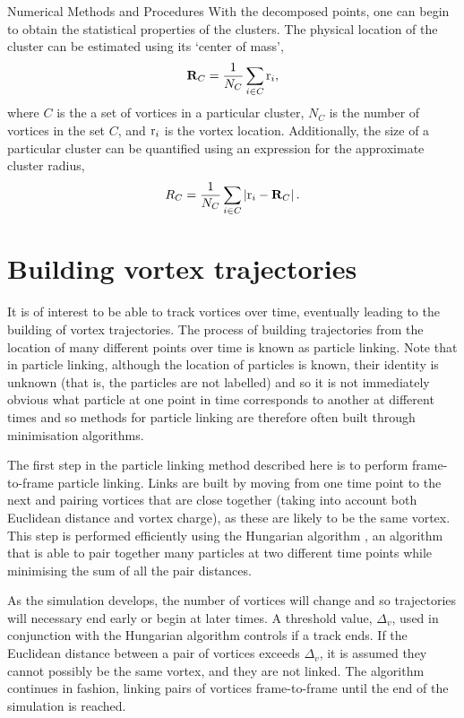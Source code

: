 \begin{chapter}{\label{cha:numerics}Numerical Methods and Procedures}
With the decomposed points, one can begin to obtain the statistical properties of the clusters. The physical location of the cluster can be estimated using its `center of mass',
\begin{equation}\label{eq:rcacom}
  \mathbf{R}_C = \frac{1}{N_C}\sum\limits_{i\in C}{\rm r}_i,
\end{equation}
where $C$ is the a set of vortices in a particular cluster, $N_C$ is the number of vortices in the set $C$, and ${\rm r}_i$ is the vortex location. Additionally, the size of a particular cluster can be quantified using an expression for the approximate cluster radius,
\begin{equation}\label{eq:rcacom}
  R_C = \frac{1}{N_C}\sum\limits_{i\in C} \left |{\rm r}_i - {\bf R}_C \right |.
\end{equation}

\section{\label{section:vortextracking} Building vortex trajectories}
It is of interest to be able to track vortices over time, eventually leading to the building of vortex trajectories. The process of building trajectories from the location of many different points over time is known as particle linking. Note that in particle linking, although the location of particles is known, their identity is unknown (that is, the particles are not labelled) and so it is not immediately obvious what particle at one point in time corresponds to another at different times and so methods for particle linking are therefore often built through minimisation algorithms. 

The first step in the particle linking method described here is to perform frame-to-frame particle linking. Links are built by moving from one time point to the next and pairing vortices that are close together (taking into account both Euclidean distance and vortex charge), as these are likely to be the same vortex. This step is performed efficiently using the Hungarian algorithm \cite{hung}, an algorithm that is able to pair together many particles at two different time points while minimising the sum of all the pair distances.

As the simulation develops, the number of vortices will change and so trajectories will necessary end early or begin at later times. A threshold value, $\Delta_v$, used in conjunction with the Hungarian algorithm controls if a track ends. If the Euclidean distance between a pair of vortices exceeds $\Delta_v$, it is assumed they cannot possibly be the same vortex, and they are not linked. The algorithm continues in fashion, linking pairs of vortices frame-to-frame until the end of the simulation is reached.


\end{chapter}
